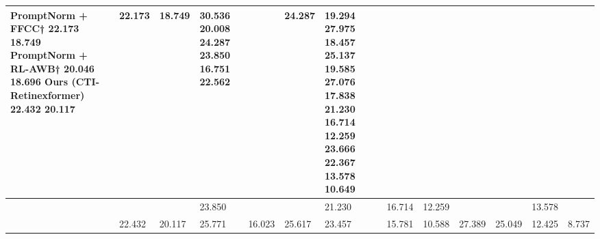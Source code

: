 \begin{tabular}{lllllllllllll}
\toprule
PromptNorm + FFCC† 22.173 18.749 PromptNorm + RL-AWB† 20.046 18.696 Ours (CTI-Retinexformer) 22.432 20.117 & 22.173 & 18.749 & 30.536 20.008 24.287 23.850 16.751 22.562 &  & 24.287 & 19.294 27.975 18.457 25.137 19.585 27.076 17.838 21.230 16.714 12.259 23.666 22.367 13.578 10.649 &  &  &  &  &  &  \\
\midrule
 &  &  & 23.850 &  &  & 21.230 & 16.714 & 12.259 &  &  & 13.578 &  \\
 & 22.432 & 20.117 & 25.771 & 16.023 & 25.617 & 23.457 & 15.781 & 10.588 & 27.389 & 25.049 & 12.425 & 8.737 \\
\bottomrule
\end{tabular}
